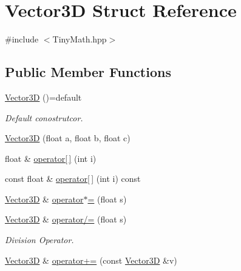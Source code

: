 \hypertarget{structVector3D}{}\section{Vector3D Struct Reference}
\label{structVector3D}


{\ttfamily \#include $<$Tiny\+Math.\+hpp$>$}

\subsection*{Public Member Functions}
\begin{DoxyCompactItemize}
\item 
\mbox{\label{structVector3D_aefc51b14ad29d8c0844bda043c97db6e}} 
\hyperlink{structVector3D_aefc51b14ad29d8c0844bda043c97db6e}{Vector3D} ()=default
\begin{DoxyCompactList}\small\item\em Default conostrutcor. \end{DoxyCompactList}\item 
\hyperlink{structVector3D_a7b0f18fa43c7a90588dedcd814122359}{Vector3D} (float a, float b, float c)
\item 
float \& \hyperlink{structVector3D_a9ada0b9382fdaf3bade67438f829280d}{operator\mbox{[}$\,$\mbox{]}} (int i)
\item 
const float \& \hyperlink{structVector3D_aeb8dfce8e40587899758e9f7d5752dc6}{operator\mbox{[}$\,$\mbox{]}} (int i) const
\item 
\hyperlink{structVector3D}{Vector3D} \& \hyperlink{structVector3D_a83d5f64613f79d60e080dc04689f1c2b}{operator$\ast$=} (float s)
\item 
\mbox{\label{structVector3D_a645dc0982d4fd81fc96ce56a6cc354a6}} 
\hyperlink{structVector3D}{Vector3D} \& \hyperlink{structVector3D_a645dc0982d4fd81fc96ce56a6cc354a6}{operator/=} (float s)
\begin{DoxyCompactList}\small\item\em Division Operator. \end{DoxyCompactList}\item 
\mbox{\label{structVector3D_a66772c7b627b9722a911ba064d165c3e}} 
\hyperlink{structVector3D}{Vector3D} \& \hyperlink{structVector3D_a66772c7b627b9722a911ba064d165c3e}{operator+=} (const \hyperlink{structVector3D}{Vector3D} \&v)

\end{DoxyCompactItemize}
